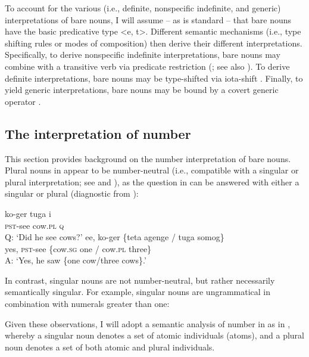 \documentclass[output=paper]{LSP/langsci}
\begin{document}
To account for the various (i.e., definite, nonspecific indefinite, and generic) interpretations of bare nouns, I will assume -- as is standard -- that bare nouns have the basic predicative type <e, t>. Different semantic mechanisms (i.e., type shifting rules or modes of composition) then derive their different interpretations. Specifically, to derive nonspecific indefinite interpretations, bare nouns may combine with a transitive verb via predicate restriction (\citealt{Chung:2004}; see also \citealt{Carlson:1977}). To derive definite interpretations, bare nouns may be type-shifted via iota-shift \citep{Partee:1987}. Finally, to yield generic interpretations, bare nouns may be bound by a covert generic operator \citep{Krifka:1995}. 

\subsection{The interpretation of number}
\label{sec:landman:number}
This section provides background on the number interpretation of bare nouns. Plural nouns in  appear to be number-neutral (i.e., compatible with a singular or plural interpretation; see \citealt{Link:1983} and \citealt{Corbett:2000}), as the question in  can be answered with either a singular or plural  (diagnostic from \citealt{Link:1983}):

 \ea \label{ex:landman:15}
  \ea\label{ex:landman:barepluralquestion}
     \gll ko-ger tuga i\\
          \textsc{pst}-see cow.\textsc{pl} \textsc{q}\\ 
     \glt Q: ‘Did he see cows?’
\ex\label{ex:landman:answers}
     \gll ee, ko-ger \{teta agenge / tuga somog\}\\
             yes, \textsc{pst}-see \{cow.\textsc{sg} one / cow.\textsc{pl} three\}\\
      \glt A: ‘Yes, he saw \{one cow/three cows\}.’
\z 
\z

In contrast, singular nouns are not number-neutral, but rather necessarily semantically singular. For example, singular nouns are ungrammatical in combination with numerals greater than one: 

\z

Given these observations, I will adopt a semantic analysis of number in  as in \citealt{Link:1983}, whereby a singular noun denotes a set of atomic individuals (atoms), and a plural noun denotes a set of both atomic and plural individuals.
\end{document}
